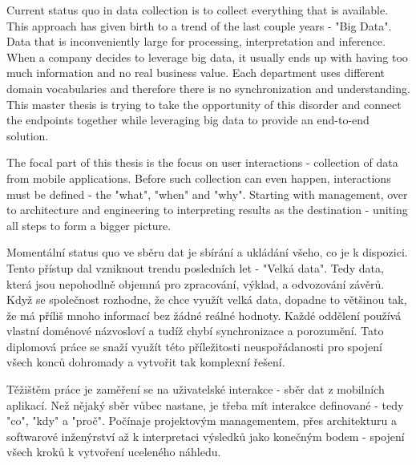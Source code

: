 \documentclass[11pt,twoside,a4paper]{book}
\begin{document}
\abstractpage

Current status quo in data collection is to collect everything that is available. This approach has given birth to a trend of the last couple years - "Big Data". Data that is inconveniently large for processing, interpretation and inference. When a company decides to leverage big data, it usually ends up with having too much information and no real business value. Each department uses different domain vocabularies and therefore there is no synchronization and understanding. This master thesis is trying to take the opportunity of this disorder and connect the endpoints together while leveraging big data to provide an end-to-end solution.

The focal part of this thesis is the focus on user interactions - collection of data from mobile applications. Before such collection can even happen, interactions must be defined - the "what", "when" and "why". Starting with management, over to architecture and engineering to interpreting results as the destination - uniting all steps to form a bigger picture.



\baselineskip

\noindent
Momentální status quo ve sběru dat je sbírání a ukládání všeho, co je k dispozici. Tento přístup dal vzniknout trendu posledních let - "Velká data". Tedy data, která jsou  nepohodlně objemná pro zpracování, výklad, a odvozování závěrů. Když se společnost rozhodne, že chce využít velká data, dopadne to většinou tak, že má příliš mnoho informací bez žádné reálné hodnoty. Každé oddělení používá vlastní doménové názvosloví a tudíž chybí synchronizace a porozumění. Tato diplomová práce se snaží využít této příležitosti neuspořádanosti pro spojení všech konců dohromady a vytvořit tak komplexní řešení.

Těžištěm práce je zaměření se na uživatelské interakce - sběr dat z mobilních aplikací. Než nějaký sběr vůbec nastane, je třeba mít interakce definované - tedy "co", "kdy" a "proč". Počínaje projektovým managementem, přes architekturu a softwarové inženýrství až k interpretaci výsledků jako konečným bodem - spojení všech kroků k vytvoření uceleného náhledu.



\tableofcontents


\end{document}
